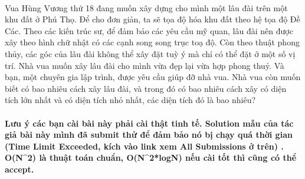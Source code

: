  

Vua Hùng Vương thứ 18 đang muốn xây dựng cho mình một lâu đài trên một khu đất ở Phú Thọ. Để cho đơn giản, ta sẽ tọa độ hóa khu đất theo hệ tọa độ Đề Các. Theo các kiến trúc sư, để đảm bảo các yêu cầu mỹ quan, lâu đài nên được xây theo hình chữ nhật có các cạnh song song trục toạ độ. Còn theo thuật phong thủy, các góc của lâu đài không thể xây đặt tuỳ ý mà chỉ có thể đặt ở một số vị trí. Nhà vua muốn xây lâu đài cho mình vừa đẹp lại vừa hợp phong thuỷ. Và bạn, một chuyên gia lập trình, được yêu cầu giúp đỡ nhà vua. Nhà vua còn muốn biết có bao nhiêu cách xây lâu đài, và trong đó có bao nhiêu cách xây có diện tích lớn nhất và có diện tích nhỏ nhất, các diện tích đó là bao nhiêu?

\paragraph{Lưu ý các bạn cài bài này phải cài thật tinh tế. Solution mẫu của tác giả bài này mình đã submit thử để đảm bảo nó bị chạy quá thời gian (Time Limit Exceeded, kích vào link xem All Submissions ở trên) . O(N^2) là thuật toán chuẩn, O(N^2*logN) nếu cài tốt thì cũng có thể accept.}